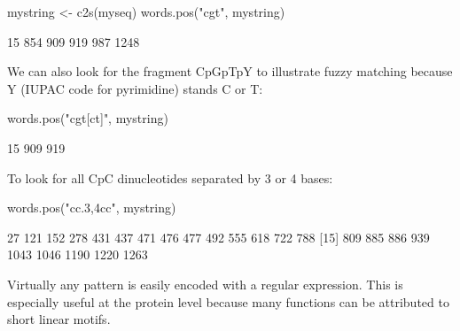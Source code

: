 \documentclass{article}
\begin{document}
\begin{Schunk}
\begin{Sinput}
 mystring <- c2s(myseq)
 words.pos("cgt", mystring)
\end{Sinput}
\begin{Soutput}
[1]   15  854  909  919  987 1248
\end{Soutput}
\end{Schunk}

We can also look for the fragment CpGpTpY to illustrate fuzzy matching because
Y (IUPAC code for pyrimidine) stands C or T:

\begin{Schunk}
\begin{Sinput}
 words.pos("cgt[ct]", mystring)
\end{Sinput}
\begin{Soutput}
[1]  15 909 919
\end{Soutput}
\end{Schunk}

To look for all CpC dinucleotides separated by 3 or 4 bases:
\begin{Schunk}
\begin{Sinput}
 words.pos("cc.{3,4}cc", mystring)
\end{Sinput}
\begin{Soutput}
 [1]   27  121  152  278  431  437  471  476  477  492  555  618  722  788
[15]  809  885  886  939 1043 1046 1190 1220 1263
\end{Soutput}
\end{Schunk}

Virtually any pattern is easily encoded with a regular expression. This is
especially useful at the protein level because many functions can be attributed 
to short linear motifs.


\clearpage
{}


\end{document}
